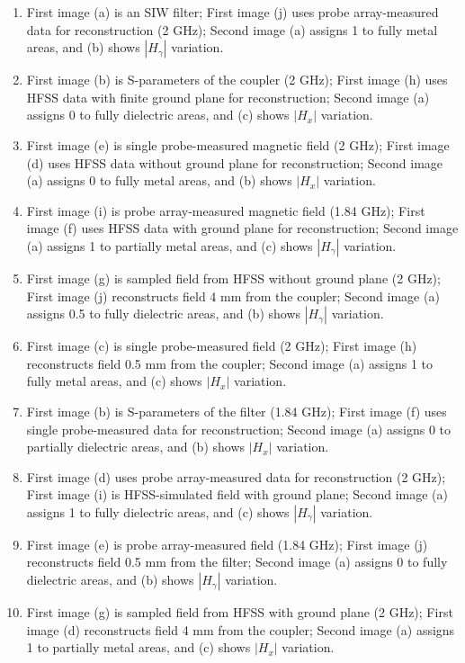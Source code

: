 \begin{tcolorbox}[
    breakable,
    title=Example of Experimental Reasoning in Information,
    colback=LighterGray,
    colframe=DeepPurple,
    colbacktitle=DeepPurple,
    coltitle=White,
]
\begin{enumerate}[label=\Alph*.]
    \item First image (a) is an SIW filter; First image (j) uses probe array-measured data for reconstruction (2 GHz); Second image (a) assigns 1 to fully metal areas, and (b) shows $|H_\gamma|$ variation.
    \item First image (b) is S-parameters of the coupler (2 GHz); First image (h) uses HFSS data with finite ground plane for reconstruction; Second image (a) assigns 0 to fully dielectric areas, and (c) shows $|H_x|$ variation.
    \item First image (e) is single probe-measured magnetic field (2 GHz); First image (d) uses HFSS data without ground plane for reconstruction; Second image (a) assigns 0 to fully metal areas, and (b) shows $|H_x|$ variation.
    \item First image (i) is probe array-measured magnetic field (1.84 GHz); First image (f) uses HFSS data with ground plane for reconstruction; Second image (a) assigns 1 to partially metal areas, and (c) shows $|H_\gamma|$ variation.
    \item First image (g) is sampled field from HFSS without ground plane (2 GHz); First image (j) reconstructs field 4 mm from the coupler; Second image (a) assigns 0.5 to fully dielectric areas, and (b) shows $|H_\gamma|$ variation.
    \item First image (c) is single probe-measured field (2 GHz); First image (h) reconstructs field 0.5 mm from the coupler; Second image (a) assigns 1 to fully metal areas, and (c) shows $|H_x|$ variation.
    \item First image (b) is S-parameters of the filter (1.84 GHz); First image (f) uses single probe-measured data for reconstruction; Second image (a) assigns 0 to partially dielectric areas, and (b) shows $|H_x|$ variation.
    \item First image (d) uses probe array-measured data for reconstruction (2 GHz); First image (i) is HFSS-simulated field with ground plane; Second image (a) assigns 1 to fully dielectric areas, and (c) shows $|H_\gamma|$ variation.
    \item First image (e) is probe array-measured field (1.84 GHz); First image (j) reconstructs field 0.5 mm from the filter; Second image (a) assigns 0 to fully dielectric areas, and (b) shows $|H_\gamma|$ variation.
    \item First image (g) is sampled field from HFSS with ground plane (2 GHz); First image (d) reconstructs field 4 mm from the coupler; Second image (a) assigns 1 to partially metal areas, and (c) shows $|H_x|$ variation.
\end{enumerate}




\end{tcolorbox}
